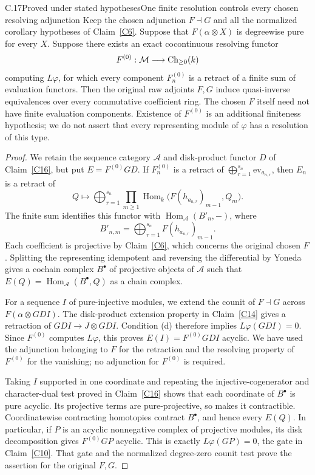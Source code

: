 \begin{claim}{C.17}{Proved under stated hypotheses}{One finite resolution controls every chosen resolving adjunction}\label{C17}
Keep the chosen adjunction $F\dashv G$ and all the normalized corollary hypotheses of Claim~\ref{C6}. Suppose that $F(\alpha\otimes X)$ is degreewise pure for every $X$. Suppose there exists an exact cocontinuous resolving functor
\[
 F^{(0)}:\mathcal M\longrightarrow\operatorname{Ch}_{\geq0}(k)
\]
computing $L\varphi$, for which every component $F^{(0)}_n$ is a retract of a finite sum of evaluation functors. Then the original raw adjoints $F,G$ induce quasi-inverse equivalences over every commutative coefficient ring. The chosen $F$ itself need not have finite evaluation components. Existence of $F^{(0)}$ is an additional finiteness hypothesis; we do not assert that every representing module of $\varphi$ has a resolution of this type.
\end{claim}
\begin{proof}
We retain the sequence category $\mathcal A$ and disk-product functor $D$ of Claim~\ref{C16}, but put $E=F^{(0)}GD$. If $F^{(0)}_n$ is a retract of $\bigoplus_{r=1}^{s_n}\mathrm{ev}_{a_{n,r}}$, then $E_n$ is a retract of
\[
 Q\longmapsto\bigoplus_{r=1}^{s_n}\prod_{m\geq1}
 \operatorname{Hom}_k\bigl(F(h_{a_{n,r}})_{m-1},Q_m\bigr).
\]
The finite sum identifies this functor with $\operatorname{Hom}_{\mathcal A}(B'_n,-)$, where
\[
 B'_{n,m}=\bigoplus_{r=1}^{s_n}F(h_{a_{n,r}})_{m-1}.
\]
Each coefficient is projective by Claim~\ref{C6}, which concerns the original chosen $F$. Splitting the representing idempotent and reversing the differential by Yoneda gives a cochain complex $B^\bullet$ of projective objects of $\mathcal A$ such that $E(Q)=\operatorname{Hom}_{\mathcal A}(B^\bullet,Q)$ as a chain complex.

For a sequence $I$ of pure-injective modules, we extend the counit of $F\dashv G$ across $F(\alpha\otimes GDI)$. The disk-product extension property in Claim~\ref{C14} gives a retraction of $GDI\to J\otimes GDI$. Condition (d) therefore implies $L\varphi(GDI)=0$. Since $F^{(0)}$ computes $L\varphi$, this proves $E(I)=F^{(0)}GDI$ acyclic. We have used the adjunction belonging to $F$ for the retraction and the resolving property of $F^{(0)}$ for the vanishing; no adjunction for $F^{(0)}$ is required.

Taking $I$ supported in one coordinate and repeating the injective-cogenerator and character-dual test proved in Claim~\ref{C16} shows that each coordinate of $B^\bullet$ is pure acyclic. Its projective terms are pure-projective, so \citet[Corollary 5.5]{Stovicek2014C} makes it contractible. Coordinatewise contracting homotopies contract $B^\bullet$, and hence every $E(Q)$. In particular, if $P$ is an acyclic nonnegative complex of projective modules, its disk decomposition gives $F^{(0)}GP$ acyclic. This is exactly $L\varphi(GP)=0$, the gate in Claim~\ref{C10}. That gate and the normalized degree-zero counit test prove the assertion for the original $F,G$.
\end{proof}



